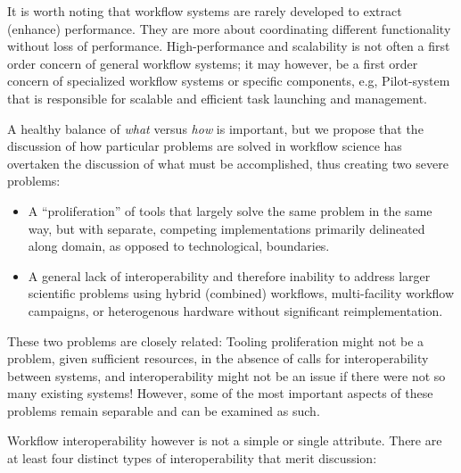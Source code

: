 It is worth noting that workflow systems are rarely developed to extract
(enhance) performance. They are more about coordinating different
functionality without loss of performance. High-performance and scalability is
not often a first order concern of general workflow systems; it may however,
be a first order concern of specialized workflow systems or specific
components, e.g, Pilot-system that is responsible for scalable and efficient
task launching and management.

A healthy balance of \textit{what} versus \textit{how} is
important, but we propose that the discussion of how particular problems are
solved in workflow science has overtaken the discussion of what must be
accomplished, thus creating two severe problems: \begin{itemize} \item A
``proliferation'' of tools that largely solve the same problem in the same way,
but with separate, competing implementations primarily delineated along domain,
as opposed to technological, boundaries.  \item A general lack of
interoperability and therefore inability to address larger scientific problems
using hybrid (combined) workflows, multi-facility workflow campaigns, or
heterogenous hardware without significant reimplementation.  \end{itemize}

These two problems are closely related: Tooling proliferation might not be a
problem, given sufficient resources, in the absence of calls for
interoperability between systems, and interoperability might not be an issue if
there were not so many existing systems! However, some of the most important
aspects of these problems remain separable and can be examined as such.

Workflow interoperability however is not a simple or single attribute. There
are at least four distinct types of interoperability that merit discussion:

